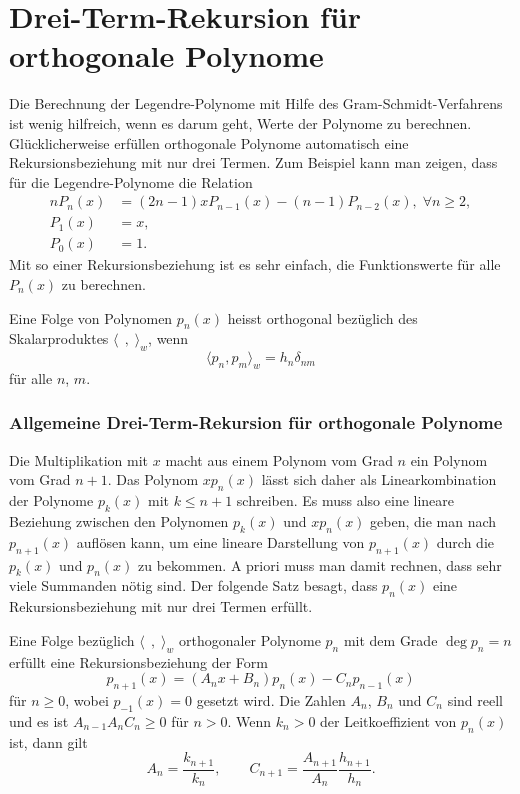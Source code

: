 %
%
%
\section{Drei-Term-Rekursion für orthogonale Polynome
\label{buch:orthogonal:section:drei-term-rekursion}}
Die Berechnung der Legendre-Polynome mit Hilfe des Gram-Schmidt-Verfahrens
ist wenig hilfreich, wenn es darum geht, Werte der Polynome zu berechnen.
Glücklicherweise erfüllen orthogonale Polynome automatisch eine 
Rekursionsbeziehung mit nur drei Termen.
Zum Beispiel kann man zeigen, dass für die Legendre-Polynome die
Relation
\begin{align*}
nP_n(x) &= (2n-1)xP_{n-1}(x) - (n-1)P_{n-2}(x),\;\forall n\ge 2,
\\
P_1(x) &= x,
\\
P_0(x) &= 1.
\end{align*}
Mit so einer Rekursionsbeziehung ist es sehr einfach, die Funktionswerte
für alle $P_n(x)$ zu berechnen.

\begin{definition}
Eine Folge von Polynomen $p_n(x)$ heisst orthogonal bezüglich des
Skalarproduktes $\langle\,\;,\;\rangle_w$, wenn 
\[
\langle p_n,p_m\rangle_w = h_n \delta_{nm}
\]
für alle $n$, $m$.
\end{definition}

\subsubsection{Allgemeine Drei-Term-Rekursion für orthogonale Polynome}
Die Multiplikation mit $x$ macht aus einem Polynom vom Grad $n$ ein
Polynom vom Grad $n+1$.
Das Polynom $xp_n(x)$ lässt sich daher als Linearkombination der
Polynome $p_k(x)$ mit $k\le n+1$ schreiben.
Es muss also eine lineare Beziehung zwischen den Polynomen $p_k(x)$ und
$xp_n(x)$ geben, die man nach $p_{n+1}(x)$ auflösen kann, um eine lineare
Darstellung von $p_{n+1}(x)$ durch die $p_k(x)$ und $p_n(x)$ zu
bekommen.
A priori muss man damit rechnen, dass sehr viele Summanden nötig sind.
Der folgende Satz besagt, dass $p_n(x)$ eine Rekursionsbeziehung mit
nur drei Termen erfüllt.

\begin{satz}
\label{buch:orthogonal:satz:drei-term-rekursion}
Eine Folge bezüglich $\langle\,\;,\;\rangle_w$ orthogonaler Polynome $p_n$ 
mit dem Grade $\deg p_n = n$ erfüllt eine Rekursionsbeziehung der Form
\begin{equation}
p_{n+1}(x)
=
(A_nx+B_n)p_n(x) - C_np_{n-1}(x)
\label{buch:orthogonal:eqn:rekursion}
\end{equation}
für $n\ge 0$, wobei $p_{-1}(x)=0$ gesetzt wird.
Die Zahlen $A_n$, $B_n$ und $C_n$ sind reell und es ist
$A_{n-1}A_nC_n\ge 0$ für $n>0$. 
Wenn $k_n>0$ der Leitkoeffizient von $p_n(x)$ ist, dann gilt
\begin{equation}
A_n=\frac{k_{n+1}}{k_n},
\qquad
C_{n+1} = \frac{A_{n+1}}{A_n}\frac{h_{n+1}}{h_n}.
\label{buch:orthogonal:eqn:koeffizientenrelation}
\end{equation}
\end{satz}

